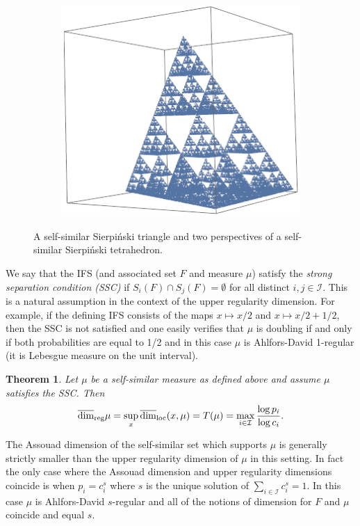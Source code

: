 \documentclass[12pt]{amsart}
\numberwithin{equation}{section}
\newtheorem{thm}{Theorem}[section]
\renewcommand{\r}{\overline{\dim}_{\textup{reg}} \mu}
\begin{document}
\begin{figure}[h]
\begin{subfigure}{.3\textwidth}
  \centering
  \includegraphics[width=.9\linewidth]{sierptetra2.png}
\end{subfigure}
\caption{A self-similar Sierpi\'nski triangle and two perspectives of a self-similar Sierpi\'nski tetrahedron.}
\label{fig:test}
\end{figure}

We say that the IFS (and associated set $F$ and measure $\mu$) satisfy the \emph{strong separation condition (SSC)} if $S_i(F) \cap S_j(F) = \emptyset$ for all distinct $i,j \in \mathcal{I}$.  This is a natural assumption in the context of the upper regularity dimension.  For example, if the defining IFS consists of the maps $x \mapsto x/2$ and $x \mapsto x/2+1/2$, then the SSC is not satisfied and one easily verifies that $\mu$ is doubling if and only if both probabilities are equal to 1/2 and in this case $\mu$ is Ahlfors-David 1-regular (it is Lebesgue measure on the unit interval). 



\begin{thm}\label{selfsimilar}
Let $\mu$ be a self-similar measure as defined above and assume $\mu$ satisfies the SSC.  Then 
\[
\r = \sup_x \overline{\dim}_{\textup{loc}}(x,\mu) = T(\mu) = \max_{i \in \mathcal{I}} \frac{\log p_i}{\log c_i}.
\]
\end{thm}

The Assouad dimension of the self-similar set which supports $\mu$ is generally strictly smaller than the upper regularity dimension of $\mu$ in this setting.  In fact the only case where the Assouad dimension and upper regularity dimensions coincide is when  $p_i=c_i^s$ where $s$ is the unique solution of $\sum_{i \in \mathcal{I}} c_i^s = 1$.   In this case $\mu$ is Ahlfors-David $s$-regular and all of the notions of dimension for $F$ and $\mu$ coincide and equal $s$.
\end{document}
